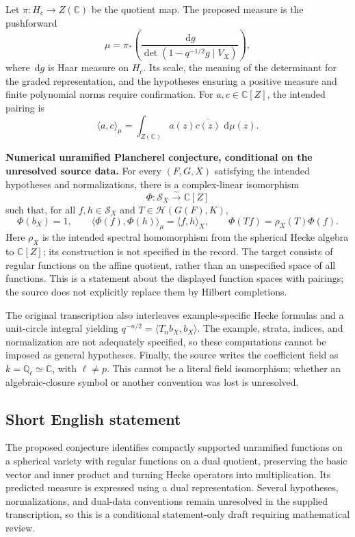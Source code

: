 \documentclass[11pt]{article}
\newcommand{\Q}{\mathbb{Q}}
\newcommand{\C}{\mathbb{C}}
\newcommand{\dd}{\,\mathrm{d}}
\begin{document}
Let \(\pi:H_c\to Z(\C)\) be the quotient map. The proposed measure is the pushforward
\[
 \mu=\pi_*\left(
 \frac{\dd g}{\det(1-q^{-1/2}g\mid V_X)}
 \right),
\]
where \(\dd g\) is Haar measure on \(H_c\). Its scale, the meaning of the determinant for the graded representation, and the hypotheses ensuring a positive measure and finite polynomial norms require confirmation. For \(a,c\in\C[Z]\), the intended pairing is
\[
 \langle a,c\rangle_\mu
 =\int_{Z(\C)}a(z)\overline{c(z)}\,\dd\mu(z).
\]

\textbf{Numerical unramified Plancherel conjecture, conditional on the unresolved source data.}
For every \((F,G,X)\) satisfying the intended hypotheses and normalizations, there is a complex-linear isomorphism
\[
 \Phi:\mathcal S_X\xrightarrow{\sim}\C[Z]
\]
such that, for all \(f,h\in\mathcal S_X\) and \(T\in\mathcal H(G(F),K)\),
\[
 \Phi(b_X)=1,\qquad
 \langle\Phi(f),\Phi(h)\rangle_\mu=\langle f,h\rangle_X,
 \qquad
 \Phi(Tf)=\rho_X(T)\Phi(f).
\]
Here \(\rho_X\) is the intended spectral homomorphism from the spherical Hecke algebra to \(\C[Z]\); its construction is not specified in the record. The target consists of regular functions on the affine quotient, rather than an unspecified space of all functions. This is a statement about the displayed function spaces with pairings; the source does not explicitly replace them by Hilbert completions.

The original transcription also interleaves example-specific Hecke formulas and a unit-circle integral yielding \(q^{-n/2}=\langle T_n b_X,b_X\rangle\). The example, strata, indices, and normalization are not adequately specified, so these computations cannot be imposed as general hypotheses. Finally, the source writes the coefficient field as \(k=\Q_\ell\simeq\C\), with \(\ell\ne p\). This cannot be a literal field isomorphism; whether an algebraic-closure symbol or another convention was lost is unresolved.
\subsection{Short English statement}
The proposed conjecture identifies compactly supported unramified functions on a spherical variety with regular functions on a dual quotient, preserving the basic vector and inner product and turning Hecke operators into multiplication. Its predicted measure is expressed using a dual representation. Several hypotheses, normalizations, and dual-data conventions remain unresolved in the supplied transcription, so this is a conditional statement-only draft requiring mathematical review.
\end{document}
